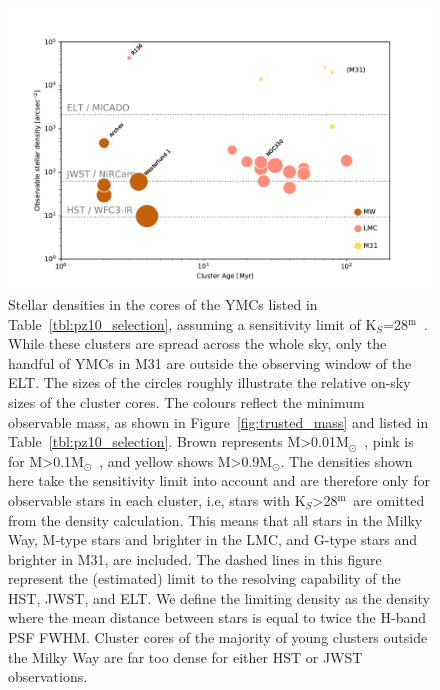 \documentclass[referee]{aa}
\newcommand{\m}{$^\mathrm{m}$~}
\newcommand{\msun}{M$_\odot$~}
\newcommand{\msune}{M$_\odot$}
\begin{document}
\begin{figure}

    \centering
    \includegraphics[width=\textwidth]{star_density_vs_age.pdf}

    \caption{
    Stellar densities in the cores of the YMCs listed in Table~\ref{tbl:pz10_selection}, assuming a sensitivity limit of K$_S$=28\m.
    While these clusters are spread across the whole sky, only the handful of YMCs in M31 are outside the observing window of the ELT.
    The sizes of the circles roughly illustrate the relative on-sky sizes of the cluster cores.
    The colours reflect the minimum observable mass, as shown in Figure~\ref{fig:trusted_mass} and listed in Table~\ref{tbl:pz10_selection}.
    Brown represents M\textgreater0.01\msun, pink is for M\textgreater0.1\msun, and yellow shows M\textgreater0.9\msune.
    The densities shown here take the sensitivity limit into account and are therefore only for observable stars in each cluster, i.e, stars with K$_S$\textgreater28\m are omitted from the density calculation.
    This means that all stars in the Milky Way, M-type stars and brighter in the LMC, and G-type stars and brighter in M31, are included.
    The dashed lines in this figure represent the (estimated) limit to the resolving capability of the HST, JWST, and ELT.
    We define the limiting density as the density where the mean distance between stars is equal to twice the H-band PSF FWHM.
    Cluster cores of the majority of young clusters outside the Milky Way are far too dense for either HST or JWST observations. }

    \label{fig:star_density_vs_age}

\end{figure}
\end{document}
